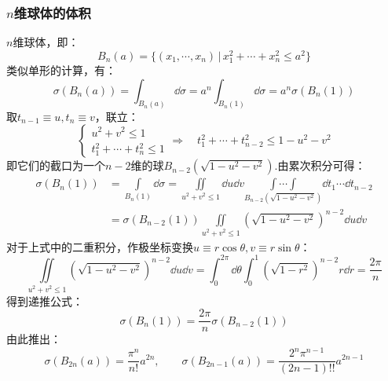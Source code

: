 \subsubsection{\texorpdfstring{$n$维球体的体积}{n维球体的体积}}
$n$维球体，即：
\[B_n(a) = \{(x_1,\cdots,x_n)\,|\,x_1^2+\cdots+x_n^2 \leqslant a^2\}\]
类似单形的计算，有：
\[\sigma(B_n(a)) = \int_{B_n(a)}\dd{\sigma} = a^n\int_{B_n(1)}\dd{\sigma} = a^n \sigma(B_n(1))\]
取$t_{n-1}\equiv u,t_n\equiv v$，联立：
\[\begin{cases}
    u^2 + v^2 \leqslant 1 \\
    t_1^2 + \cdots + t_n^2 \leqslant 1
\end{cases}\Rightarrow\quad t_1^2+\cdots+t_{n-2}^2 \leqslant 1-u^2-v^2\]
即它们的截口为一个$n-2$维的球$B_{n-2}(\sqrt{1-u^2-v^2})$.由累次积分可得：
\begin{align*}
    \sigma(B_n(1)) &= \underset{B_n(1)}{\int}\dd{\sigma} = \underset{u^2+v^2\leqslant1}{\iint}\dd{u}\dd{v} \underset{B_{n-2}(\sqrt{1-u^2-v^2})}{\int\cdots\int}\dd{t_1}\cdots\dd{t_{n-2}} \\
    &= \sigma(B_{n-2}(1))\underset{u^2+v^2\leqslant1}{\iint}(\sqrt{1-u^2-v^2})^{n-2}\dd{u}\dd{v}
\end{align*}
对于上式中的二重积分，作极坐标变换$u\equiv r\cos\theta,v\equiv r\sin\theta$：
\[\underset{u^2+v^2\leqslant1}{\iint}(\sqrt{1-u^2-v^2})^{n-2}\dd{u}\dd{v} = \int_{0}^{2\pi}\dd{\theta}\int_{0}^{1}(\sqrt{1-r^2})^{n-2}r\dd{r} = \frac{2\pi}{n}\]
得到递推公式：
\[\sigma(B_n(1)) = \frac{2\pi}{n}\sigma(B_{n-2}(1))\]
由此推出：
\[\sigma(B_{2n}(a)) = \frac{\pi^n}{n!}a^{2n},\qquad \sigma(B_{2n-1}(a)) = \frac{2^n \pi^{n-1}}{(2n-1)!!}a^{2n-1}\]